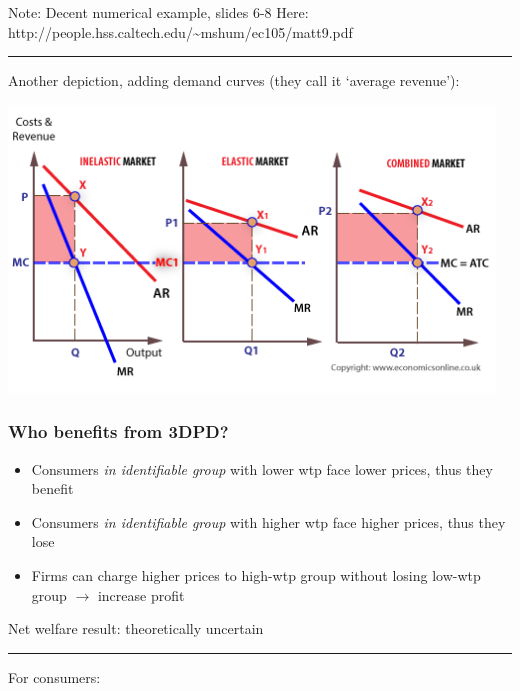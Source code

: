 \documentclass[]{article}
\providecommand{\tightlist}{%
  \setlength{\itemsep}{0pt}\setlength{\parskip}{0pt}}
\begin{document}
Note: Decent numerical example, slides 6-8 Here:
http://people.hss.caltech.edu/\textasciitilde mshum/ec105/matt9.pdf

\begin{center}\rule{0.5\linewidth}{\linethickness}\end{center}

Another depiction, adding demand curves (they call it `average
revenue'):

\includegraphics[height=3in]{picsfigs/Price-discrimination-SNP2.png}

\hypertarget{who-benefits-from-3dpd}{%
\subsubsection{Who benefits from 3DPD?}\label{who-benefits-from-3dpd}}

\begin{itemize}
\tightlist
\item
  Consumers \emph{in identifiable group} with lower wtp face lower
  prices, thus they benefit
\item
  Consumers \emph{in identifiable group} with higher wtp face higher
  prices, thus they lose
\item
  Firms can charge higher prices to high-wtp group without losing
  low-wtp group \(\rightarrow\) increase profit
\end{itemize}

\bigskip

Net welfare result: theoretically uncertain

\begin{center}\rule{0.5\linewidth}{\linethickness}\end{center}

For consumers:
\end{document}
